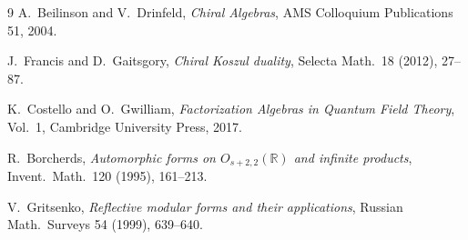 \documentclass[11pt]{amsart}
\theoremstyle{plain}
\theoremstyle{definition}
\theoremstyle{remark}
\begin{document}
\begin{thebibliography}{9}
A.~Beilinson and V.~Drinfeld, \emph{Chiral Algebras},
AMS Colloquium Publications 51, 2004.

J.~Francis and D.~Gaitsgory, \emph{Chiral Koszul duality},
Selecta Math.\ 18 (2012), 27--87.

K.~Costello and O.~Gwilliam, \emph{Factorization Algebras in Quantum
Field Theory}, Vol.~1, Cambridge University Press, 2017.

R.~Borcherds, \emph{Automorphic forms on $O_{s+2,2}(\mathbb R)$ and
infinite products}, Invent.\ Math.\ 120 (1995), 161--213.

V.~Gritsenko, \emph{Reflective modular forms and their applications},
Russian Math.\ Surveys 54 (1999), 639--640.
\end{thebibliography}
\end{document}
